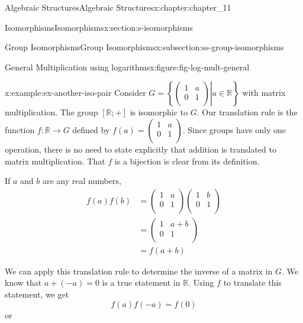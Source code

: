 \documentclass[oneside,10pt,]{book}
\numberwithin{equation}{section}
\begin{document}
\begin{chapterptx}{Algebraic Structures}{}{Algebraic Structures}{}{}{x:chapter:chapter_11}
\begin{sectionptx}{Isomorphisms}{}{Isomorphisms}{}{}{x:section:s-isomorphisms}
\begin{subsectionptx}{Group Isomorphisms}{}{Group Isomorphisms}{}{}{x:subsection:ss-group-isomorphisms}
\begin{figureptx}{General Multiplication using logarithms}{x:figure:fig-log-mult-general}{}
\begin{image}{0.15}{0.7}{0.15}
\end{image}%
\tcblower
\end{figureptx}%
\begin{example}{}{x:example:ex-another-iso-pair}%
Consider  \(G= \left\{\left.\left(
\begin{array}{cc}
1 & a \\
0 & 1 \\
\end{array}
\right) \right| a \in \mathbb{R}\right\}\) with matrix multiplication.   The group \([\mathbb{R};+]\) is isomorphic to \(G\).   Our translation rule is the function \(f: \mathbb{R} \to G\) defined by \(f(a)=\left(
\begin{array}{cc}
1 & a \\
0 & 1 \\
\end{array}
\right)\).  Since groups have only one operation, there is no need to state explicitly that addition is translated to matrix multiplication. That \(f\) is a bijection is clear from its definition.%
\par
If \(a\) and \(b\) are any real numbers,%
\begin{equation*}
\begin{split}
f(a) f(b) & = \left(
\begin{array}{cc}
1 & a \\
0 & 1 \\
\end{array}
\right)\left(
\begin{array}{cc}
1 & b \\
0 & 1 \\
\end{array}
\right)\\
& = \left(
\begin{array}{cc}
1 & a + b \\
0 & 1 \\
\end{array}
\right)\\
& = f(a + b)
\end{split}
\end{equation*}
%
\par
We can apply this translation rule to determine the inverse of a matrix in \(G\). We know that \(a + (-a)=0\) is a true statement in \(\mathbb{R}\). Using \(f\) to translate this statement, we get%
\begin{equation*}
f(a) f(-a) = f(0)
\end{equation*}
or%
\begin{equation*}

\end{equation*}
\end{example}
\end{subsectionptx}
\end{sectionptx}
\end{chapterptx}
\end{document}
